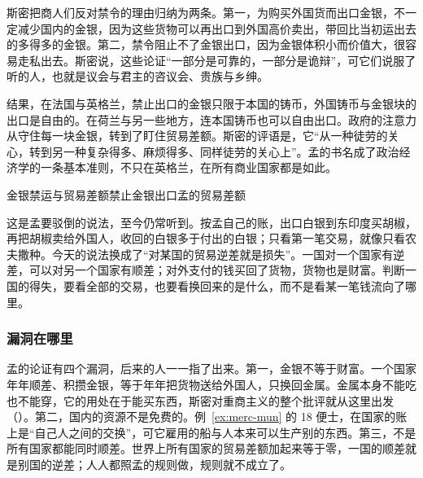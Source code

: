 斯密把商人们反对禁令的理由归纳为两条。第一，为购买外国货而出口金银，不一定减少国内的金银，因为这些货物可以再出口到外国高价卖出，带回比当初运出去的多得多的金银。第二，禁令阻止不了金银出口，因为金银体积小而价值大，很容易走私出去。斯密说，这些论证“一部分是可靠的，一部分是诡辩”，可它们说服了听的人，也就是议会与君主的咨议会、贵族与乡绅\cite{smith1776}。

结果，在法国与英格兰，禁止出口的金银只限于本国的铸币，外国铸币与金银块的出口是自由的。在荷兰与另一些地方，连本国铸币也可以自由出口。政府的注意力从守住每一块金银，转到了盯住贸易差额。斯密的评语是，它“从一种徒劳的关心，转到另一种复杂得多、麻烦得多、同样徒劳的关心上”。孟的书名成了政治经济学的一条基本准则，不只在英格兰，在所有商业国家都是如此\cite{smith1776}。

\begin{compare}{金银禁运与贸易差额}{禁止金银出口}{孟的贸易差额}
\end{compare}

\begin{pitfall}[出口金银一定让国家变穷]
这是孟要驳倒的说法，至今仍常听到。按孟自己的账，出口白银到东印度买胡椒，再把胡椒卖给外国人，收回的白银多于付出的白银；只看第一笔交易，就像只看农夫撒种。今天的说法换成了“对某国的贸易逆差就是损失”。一国对一个国家有逆差，可以对另一个国家有顺差；对外支付的钱买回了货物，货物也是财富。判断一国的得失，要看全部的交易，也要看换回来的是什么，而不是看某一笔钱流向了哪里。
\end{pitfall}

\subsubsection{漏洞在哪里}
孟的论证有四个漏洞，后来的人一一指了出来。第一，金银不等于财富。一个国家年年顺差、积攒金银，等于年年把货物送给外国人，只换回金属。金属本身不能吃也不能穿，它的用处在于能买东西，斯密对重商主义的整个批评就从这里出发（）。第二，国内的资源不是免费的。例~\ref{ex:merc-mun} 的 18 便士，在国家的账上是“自己人之间的交换”，可它雇用的船与人本来可以生产别的东西。第三，不是所有国家都能同时顺差。世界上所有国家的贸易差额加起来等于零，一国的顺差就是别国的逆差；人人都照孟的规则做，规则就不成立了。

